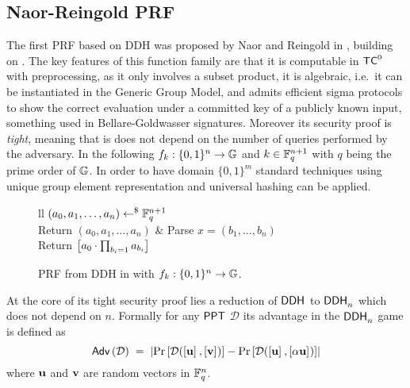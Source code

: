 
\subsection{Naor-Reingold PRF}
The first PRF based on DDH was proposed by Naor and Reingold in \cite{FOCS:NaoRei97}, building on \cite{FOCS:GolGolMic84}.
The key features of this function family are that it is computable in $\mathsf{TC}^0$ with preprocessing, as it only involves a subset product, it is algebraic, i.e.\ it can be instantiated in the Generic Group Model, and admits efficient sigma protocols to show the correct evaluation under a committed key of a publicly known input, something used in Bellare-Goldwasser \cite{C:BelGol89} signatures.
Moreover its security proof is \textit{tight}, meaning that is does not depend on the number of queries performed by the adversary.
In the following $f_k: \{0, 1\}^n \to \mathbb{G}$ and $k \in \mathbb{F}_q^{n+1}$ with $q$ being the prime order of $\mathbb{G}$.
In order to have domain $\{0, 1\}^m$ standard techniques using unique group element representation and universal hashing can be applied.

\begin{figure}[htb]
\centering
\begin{pcarray}{ll}
		{
			$(a_0, a_1, \ldots, a_n) \gets^{\$} \mathbb{F}_q^{n+1}$
				\\
			Return $(a_0, a_1, \ldots, a_n)$
		}
			&
		{
			Parse $x = (b_1, \ldots, b_n)$
				\\
			Return $\left[{a_0 \cdot \prod_{b_i = 1} a_{b_i}}\right]_{}$
		}
\end{pcarray}
\caption{PRF from DDH in \cite{FOCS:NaoRei97} with $f_k: \{0, 1\}^n \to \mathbb{G}$.}
\label{prot:NaoRei88:prf_from_ddh}
\end{figure}

At the core of its tight security proof lies a reduction of $\mathsf{DDH}^{}$ to $\mathsf{DDH}^{}_n$ which does not depend on $n$. Formally for any $\mathsf{PPT}$ $\mathcal{D}$ its advantage in the $\mathsf{DDH}^{}_n$ game is defined as
\[
	\mathsf{Adv}\left(\mathcal{D}\right)
		\; = \;
	\left|
		\Pr \left[ \mathcal{D}(\left[{\mathbf{u}}\right]_{}, \left[{\mathbf{v}}\right]_{}) \right]
			-
		\Pr \left[ \mathcal{D}(\left[{\mathbf{u}}\right]_{}, \left[{\alpha \mathbf{u}}\right]_{}) \right]
	\right|
\]
where $\mathbf{u}$ and $\mathbf{v}$ are random vectors in $\mathbb{F}_q^n$.

